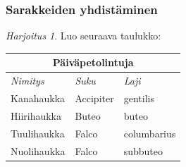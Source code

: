 \documentclass[handout,hyperref={colorlinks=true}]{beamer}
\theoremstyle{remark}
\newtheorem{harj}{Harjoitus}[section]
\begin{document}
\begin{frame}[fragile]
    \frametitle{Sarakkeiden yhdistäminen}

    \begin{harj}
        Luo seuraava taulukko:
        \begin{table}
            \begin{tabular}{|l|l|l|}
                \hline
                \multicolumn{3}{|c|}{\Large Päiväpetolintuja}\\
                \hline
                \textit{Nimitys} & \textit{Suku} & \textit{Laji}\\ \hline
                Kanahaukka & Accipiter &  gentilis\\ \hline
                Hiirihaukka & Buteo & buteo\\ \hline
                Tuulihaukka & Falco & columbarius\\\hline
                Nuolihaukka & Falco & subbuteo\\ \hline
            \end{tabular}
        \end{table}
    \end{harj}

\end{frame}
\end{document}
